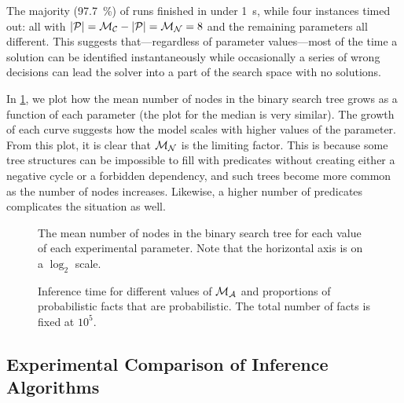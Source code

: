 The majority (\SI{97.7}{\percent}) of runs finished in under \SI{1}{\second},
while four instances timed out: all with $|\mathcal{P}{}| = \mathcal{M}_{\mathcal{C}}{} -
|\mathcal{P}{}| = \mathcal{M}_{\mathcal{N}}{} = 8$ and the remaining parameters all
different. This suggests that---regardless of parameter values---most of the
time a solution can be identified instantaneously while occasionally a series of
wrong decisions can lead the solver into a part of the search space with no
solutions.

In \cref{fig:impact}, we plot how the mean number of nodes in the binary search
tree grows as a function of each parameter (the plot for the median is very
similar). The growth of each curve suggests how the model scales with higher
values of the parameter. From this plot, it is clear that $\mathcal{M}_{\mathcal{N}}{}$ is
the limiting factor. This is because some tree structures can be impossible to
fill with predicates without creating either a negative cycle or a forbidden
dependency, and such trees become more common as the number of nodes increases.
Likewise, a higher number of predicates complicates the situation as well.

\begin{figure}
  \centering
  \caption{The mean number of nodes in the binary search tree for each value of
    each experimental parameter. Note that the horizontal axis is on a $\log_2$
    scale.}\label{fig:impact}
\end{figure}

\begin{figure}
  \centering
  \caption{Inference time for different values of $\mathcal{M}_{\mathcal{A}}{}$ and proportions
    of probabilistic facts that are probabilistic. The total number of facts is
    fixed at $10^5$.}\label{fig:bars}
\end{figure}

\subsection{Experimental Comparison of Inference Algorithms} \label{sec:1experiment2}


